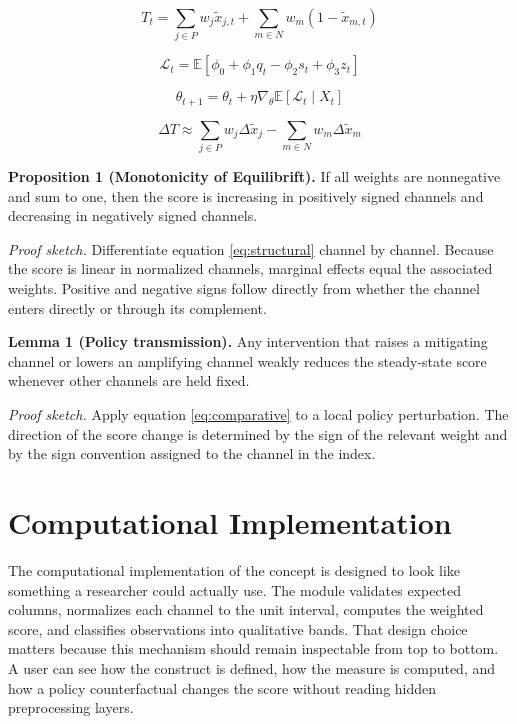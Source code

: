 \documentclass[12pt]{article}
\begin{document}
\begin{equation}
T_t = \sum_{j \in P} w_j \tilde{x}_{j,t} + \sum_{m \in N} w_m (1 - \tilde{x}_{m,t})
\label{eq:structural}
\end{equation}

\begin{equation}
\mathcal{L}_t = \mathbb{E}\left[\phi_0 + \phi_1 q_t - \phi_2 s_t + \phi_3 z_t\right]
\label{eq:loss}
\end{equation}

\begin{equation}
\theta_{t+1} = \theta_t + \eta \nabla_\theta \mathbb{E}[\mathcal{L}_t \mid X_t]
\label{eq:update}
\end{equation}

\begin{equation}
\Delta T \approx \sum_{j \in P} w_j \Delta \tilde{x}_j - \sum_{m \in N} w_m \Delta \tilde{x}_m
\label{eq:comparative}
\end{equation}

\textbf{Proposition 1 (Monotonicity of Equilibrift).} If all weights are nonnegative and sum to one, then the score is increasing in positively signed channels and decreasing in negatively signed channels.

\textit{Proof sketch.} Differentiate equation \eqref{eq:structural} channel by channel. Because the score is linear in normalized channels, marginal effects equal the associated weights. Positive and negative signs follow directly from whether the channel enters directly or through its complement.

\textbf{Lemma 1 (Policy transmission).} Any intervention that raises a mitigating channel or lowers an amplifying channel weakly reduces the steady-state score whenever other channels are held fixed.

\textit{Proof sketch.} Apply equation \eqref{eq:comparative} to a local policy perturbation. The direction of the score change is determined by the sign of the relevant weight and by the sign convention assigned to the channel in the index.

\section{Computational Implementation}
The computational implementation of the concept is designed to look like something a researcher could actually use. The module validates expected columns, normalizes each channel to the unit interval, computes the weighted score, and classifies observations into qualitative bands. That design choice matters because this mechanism should remain inspectable from top to bottom. A user can see how the construct is defined, how the measure is computed, and how a policy counterfactual changes the score without reading hidden preprocessing layers.
\end{document}
